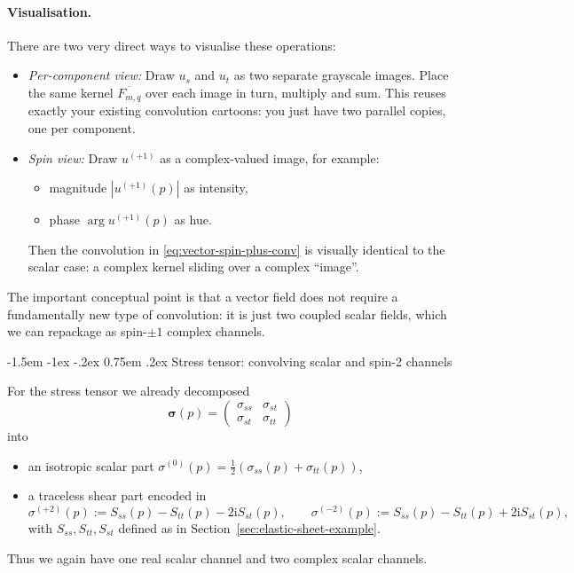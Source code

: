 \documentclass[12pt]{article}
\makeatletter
\renewcommand\subsection{\@startsection{subsection}{2}{\z@}%
                                     {-1.5em \@plus -1ex \@minus -.2ex}%
                                     {0.75em \@plus .2ex}%
                                     {\normalfont\large\bfseries}}
\makeatother
\begin{document}
\paragraph{Visualisation.}
There are two very direct ways to visualise these operations:

\begin{itemize}
  \item \emph{Per-component view:} Draw $u_s$ and $u_t$ as two
        separate grayscale images. Place the same kernel
        $\overline{F_{m,q}}$ over each image in turn, multiply and
        sum. This reuses exactly your existing convolution cartoons:
        you just have two parallel copies, one per component.
  \item \emph{Spin view:} Draw $u^{(+1)}$ as a complex-valued image,
        for example:
        \begin{itemize}
          \item magnitude $|u^{(+1)}(p)|$ as intensity,
          \item phase $\arg u^{(+1)}(p)$ as hue.
        \end{itemize}
        Then the convolution in \eqref{eq:vector-spin-plus-conv} is
        visually identical to the scalar case: a complex kernel
        sliding over a complex ``image''.
\end{itemize}

The important conceptual point is that a vector field does not require
a fundamentally new type of convolution: it is just two coupled scalar
fields, which we can repackage as spin-$\pm1$ complex channels.

\subsection{Stress tensor: convolving scalar and spin-2 channels}

For the stress tensor we already decomposed
\[
  \boldsymbol{\sigma}(p)
  =
  \begin{pmatrix}
    \sigma_{ss} & \sigma_{st} \\
    \sigma_{st} & \sigma_{tt}
  \end{pmatrix}
\]
into
\begin{itemize}
  \item an isotropic scalar part
    $\sigma^{(0)}(p) = \tfrac12(\sigma_{ss}(p)+\sigma_{tt}(p))$,
  \item a traceless shear part encoded in
    \[
      \sigma^{(+2)}(p)
      := S_{ss}(p)-S_{tt}(p)-2\mathrm{i}S_{st}(p),
      \qquad
      \sigma^{(-2)}(p)
      := S_{ss}(p)-S_{tt}(p)+2\mathrm{i}S_{st}(p),
    \]
    with $S_{ss},S_{tt},S_{st}$ defined as in
    Section~\ref{sec:elastic-sheet-example}.
\end{itemize}
Thus we again have one real scalar channel and two complex scalar
channels.
\end{document}
